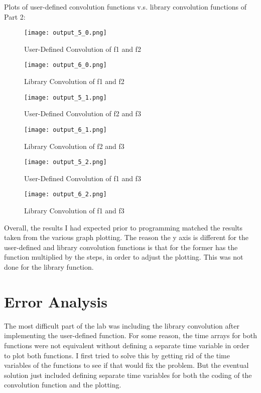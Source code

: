 \documentclass[12pt]{article}
\begin{document}
Plots of user-defined convolution functions v.s. library convolution functions of Part 2:
\begin{figure}[H]
\texttt{[image: output\_5\_0.png]}
  \caption{User-Defined Convolution of f1 and f2}
  \end{figure}
\begin{figure}[H]
\texttt{[image: output\_6\_0.png]}
  \caption{Library Convolution of f1 and f2}
  \end{figure}  
\begin{figure}[H]
\texttt{[image: output\_5\_1.png]}
  \caption{User-Defined Convolution of f2 and f3}
  \end{figure} 
  \begin{figure}[H]
\texttt{[image: output\_6\_1.png]}
  \caption{Library Convolution of f2 and f3}
  \end{figure}  
\begin{figure}[H]
\texttt{[image: output\_5\_2.png]}
  \caption{User-Defined Convolution of f1 and f3}
  \end{figure}
  \begin{figure}[H]
\texttt{[image: output\_6\_2.png]}
  \caption{Library Convolution of f1 and f3}
  \end{figure}  
Overall, the results I had expected prior to programming matched the results taken from the various graph plotting.
The reason the y axis is different for the user-defined and library convolution functions is that for the former has the function multiplied by the steps, in order to adjust the plotting. This was not done for the library function.

\section{Error Analysis}
The most difficult part of the lab was including the library convolution after implementing the user-defined function. For some reason, the time arrays for both functions were not equivalent without defining a separate time variable in order to plot both functions. I first tried to solve this by getting rid of the time variables of the functions to see if that would fix the problem. But the eventual solution just included defining separate time variables for both the coding of the convolution function and the plotting.
\end{document}
